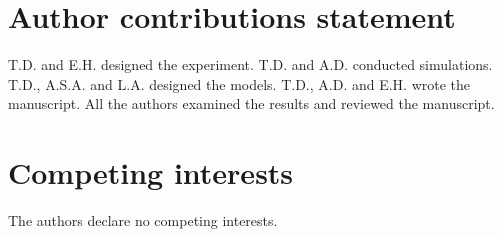 \documentclass[fleqn,10pt]{wlscirep}
\begin{document}
\section*{Author contributions statement}
T.D. and E.H. designed the experiment. T.D. and A.D. conducted simulations. T.D., A.S.A. and L.A. designed the models. T.D., A.D. and E.H. wrote the manuscript. All the authors examined the results and reviewed the manuscript.


\section*{Competing interests}
The authors declare no competing interests.
\end{document}
